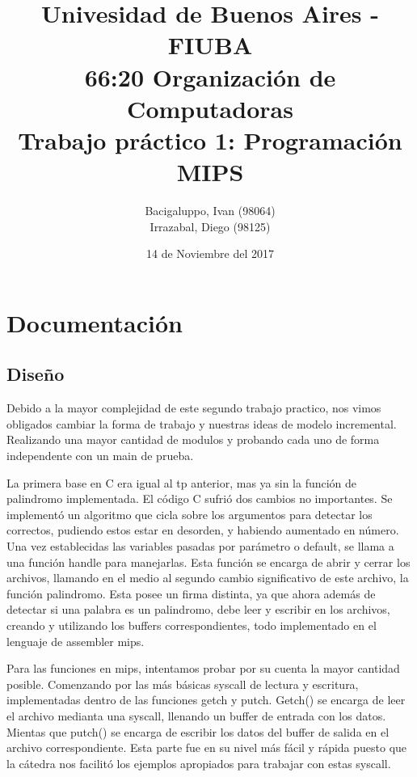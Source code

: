 \documentclass[10pt,a4paper]{article}
\begin{document}
\date{14 de Noviembre del 2017}

\title{Univesidad de Buenos Aires - FIUBA \\ 66:20 Organización de Computadoras \\ Trabajo práctico 1: Programación MIPS}

\author{Bacigaluppo, Ivan (98064) \\ Irrazabal, Diego (98125)}

\maketitle

\thispagestyle{empty}

\newpage

\setcounter{page}{1}

\tableofcontents

\newpage

\section{Documentación}

\subsection{Diseño}

Debido a la mayor complejidad de este segundo trabajo practico, nos vimos obligados cambiar la forma de trabajo y nuestras ideas de modelo incremental. Realizando una mayor cantidad de modulos y probando cada uno de forma independente con un main de prueba.

La primera base en C era igual al tp anterior, mas ya sin la función de palindromo implementada. El código C sufrió dos cambios no importantes. Se implementó un algoritmo que cicla sobre los argumentos para detectar los correctos, pudiendo estos estar en desorden, y habiendo aumentado en número. Una vez establecidas las variables pasadas por parámetro o default, se llama a una función handle para manejarlas. Esta función se encarga de abrir y cerrar los archivos, llamando en el medio al segundo cambio significativo de este archivo, la función palindromo. Esta posee un firma distinta, ya que ahora además de detectar si una palabra es un palindromo, debe leer y escribir en los archivos, creando y utilizando los buffers correspondientes, todo implementado en el lenguaje de assembler mips.

Para las funciones en mips, intentamos probar por su cuenta la mayor cantidad posible. Comenzando por las más básicas syscall de lectura y escritura, implementadas dentro de las funciones getch y putch. Getch() se encarga de leer el archivo medianta una syscall, llenando un buffer de entrada con los datos. Mientas que putch() se encarga de escribir los datos del buffer de salida en el archivo correspondiente.
Esta parte fue en su nivel más fácil y rápida puesto que la cátedra nos facilitó los ejemplos apropiados para trabajar con estas syscall.
\end{document}
